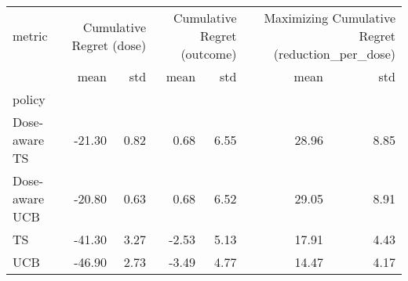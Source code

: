 \begin{tabular}{lrrrrrr}
metric & \multicolumn{2}{r}{Cumulative Regret (dose)} & \multicolumn{2}{r}{Cumulative Regret (outcome)} & \multicolumn{2}{r}{Maximizing Cumulative Regret (reduction_per_dose)} \\
 & mean & std & mean & std & mean & std \\
policy &  &  &  &  &  &  \\
Dose-aware TS & -21.30 & 0.82 & 0.68 & 6.55 & 28.96 & 8.85 \\
Dose-aware UCB & -20.80 & 0.63 & 0.68 & 6.52 & 29.05 & 8.91 \\
TS & -41.30 & 3.27 & -2.53 & 5.13 & 17.91 & 4.43 \\
UCB & -46.90 & 2.73 & -3.49 & 4.77 & 14.47 & 4.17 \\
\end{tabular}
